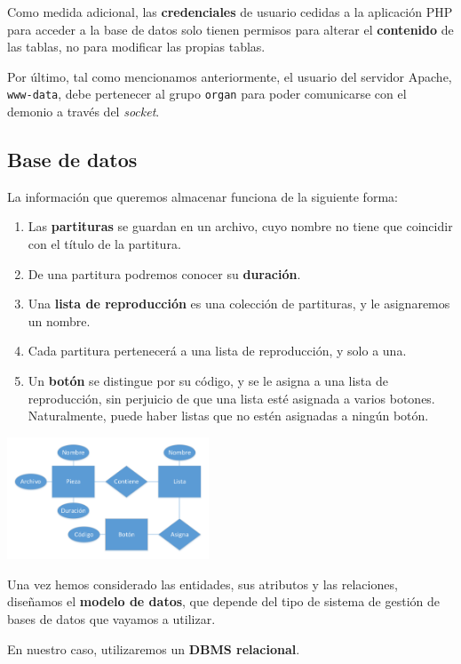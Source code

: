 \documentclass[10pt,a4paper]{article}
\begin{document}
	Como medida adicional, las \textbf{credenciales} de usuario cedidas a la aplicación PHP para acceder a la base de datos solo tienen permisos para alterar el \textbf{contenido} de las tablas, no para modificar las propias tablas.
	
	Por último, tal como mencionamos anteriormente, el usuario del servidor Apache, \verb|www-data|, debe pertenecer al grupo \verb|organ| para poder comunicarse con el demonio a través del \textit{socket}.
	
	\subsection{Base de datos}
	\label{subsec:database}
	
	La información que queremos almacenar funciona de la siguiente forma:
	
	\begin{enumerate}
		\item Las \textbf{partituras} se guardan en un archivo, cuyo nombre no tiene que coincidir con el título de la partitura.
		\item De una partitura podremos conocer su \textbf{duración}.
		\item Una \textbf{lista de reproducción} es una colección de partituras, y le asignaremos un nombre.
		\item Cada partitura pertenecerá a una lista de reproducción, y solo a una.
		\item Un \textbf{botón} se distingue por su código, y se le asigna a una lista de reproducción, sin perjuicio de que una lista esté asignada a varios botones. Naturalmente, puede haber listas que no estén asignadas a ningún botón.
	\end{enumerate}
	
	\clearpage
	
	\begin{multicols}{2}
		\noindent
		\begin{center}
			\includegraphics[width=0.45\textwidth]{images/bd_er} 
		\end{center}
		\columnbreak
		Una vez hemos considerado las entidades, sus atributos y las relaciones, diseñamos el \textbf{modelo de datos}, que depende del tipo de sistema de gestión de bases de datos que vayamos a utilizar.
		
		En nuestro caso, utilizaremos un \textbf{DBMS relacional}.
	\end{multicols}
	
\end{document}

